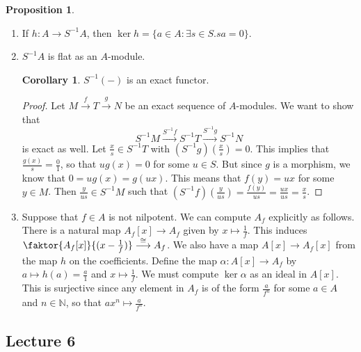 \documentclass[10pt,letterpaper,cm]{nupset}
\theoremstyle{definition}
\newtheorem{prop}{Proposition}
\newtheorem{corollary}{Corollary}
\newcommand{\N}{\mathbb N}
\newcommand{\1}{\mathbf{1}}
\newcommand{\0}{\vec 0}
\begin{document}
\begin{prop} $ $
\begin{enumerate}
\item If $h: A \to S^{-1}A$, then $\ker{h} = \{a\in A : \exists s\in S. sa = 0\}$.
\item $S^{-1}A$ is flat as an $A$-module.
\begin{corollary}
$S^{-1}(-)$ is an exact functor.
\end{corollary}
\begin{proof}
Let $M \overset{f}{\longrightarrow} T \overset{g}{\longrightarrow} N$ be an exact sequence of $A$-modules. We want to show that $$S^{-1}M \overset{S^{-1}f}{\longrightarrow} S^{-1}T \overset{S^{-1}g}{\longrightarrow} S^{-1}N$$ is exact as well. Let $\frac{x}{s} \in S^{-1}T$ with $(S^{-1}g)(\frac{x}{s}) = 0$. This implies that $\frac{g(x)}{s} = \frac{0}{1}$, so that $ug(x) = 0$ for some $u\in S$. But since $g$ is a morphism, we know that $0 = ug(x) = g(ux)$. This means that $f(y) = ux$ for some $y\in M$. Then $\frac{y}{us}\in S^{-1}M$ such that $(S^{-1}f)(\frac{y}{us}) = \frac{f(y)}{us} = \frac{ux}{us} = \frac{x}{s}$.
\end{proof}
\item Suppose that $f\in A$ is not nilpotent. We can compute $A_f$ explicitly as follows. There is a natural map $A_f[x] \to A_f$ given by $x \mapsto \frac{1}{f}$. This induces $\faktor{A_f[x]}{(x-\frac{1}{f})} \overset{\cong}{\longrightarrow} A_f$. We also have a map $A[x] \to A_f[x]$ from the  map $h$ on the coefficients. Define the map $\alpha: A[x] \to A_f$ by $a \mapsto h(a) = \frac{a}{1}$ and $x\mapsto \frac{1}{f}$. We must compute $\ker{\alpha}$ as an ideal in $A[x]$. This is surjective since any element in $A_f$ is of the form $\frac{a}{f^n}$ for some $a\in A $ and $n\in \N$, so that $ax^n \mapsto \frac{a}{f^n}$.
\end{enumerate}
\end{prop}

\subsection{Lecture 6}
\end{document}
